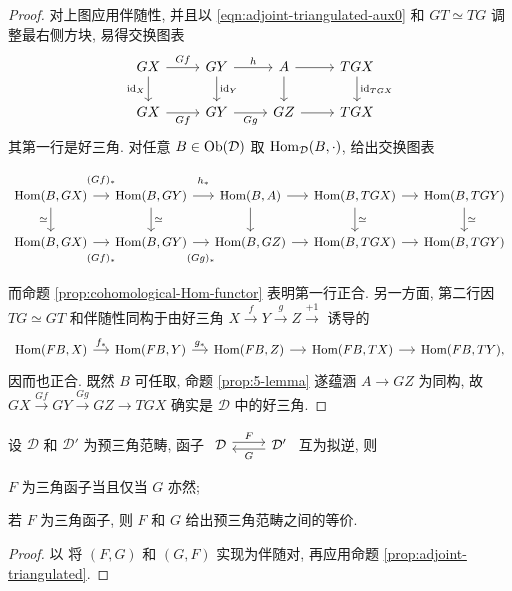 \begin{proof}
	对上图应用伴随性, 并且以 \eqref{eqn:adjoint-triangulated-aux0} 和 $GT \simeq TG$ 调整最右侧方块, 易得交换图表
	\[\begin{tikzcd}
		GX \arrow[r, "Gf"] \arrow[d, "\identity_X"'] & GY \arrow[d, "\identity_Y"] \arrow[r, "h"] & A \arrow[r] \arrow[d] & TGX \arrow[d, "\identity_{TGX}"] \\
		GX \arrow[r, "Gf"'] & GY \arrow[r, "Gg"'] & GZ \arrow[r] & TGX
	\end{tikzcd}\]
	其第一行是好三角. 对任意 $B \in \operatorname{Ob}(\mathcal{D})$ 取 $\operatorname{Hom}_{\mathcal{D}}(B, \cdot)$, 给出交换图表
	\[\begin{tikzcd}[column sep=small, every cell/.append style={font=\small}]
		\Hom(B, GX) \arrow[r, "(Gf)_*" inner sep=0.8em] \arrow[d, "\simeq"'] & \Hom(B, GY) \arrow[r, "h_*" inner sep=0.8em] \arrow[d, "\simeq"] & \Hom(B, A) \arrow[d] \arrow[r] & \Hom(B, TGX) \arrow[r] \arrow[d, "\simeq"] & \Hom(B, TGY) \arrow[d, "\simeq"] \\
		\Hom(B, GX) \arrow[r, "(Gf)_*"' inner sep=0.8em] & \Hom(B, GY) \arrow[r, "(Gg)_*"' inner sep=0.8em] & \Hom(B, GZ) \arrow[r] & \Hom(B, TGX) \arrow[r] & \Hom(B, TGY)
	\end{tikzcd}\]
	而命题 \ref{prop:cohomological-Hom-functor} 表明第一行正合. 另一方面, 第二行因 $TG \simeq GT$ 和伴随性同构于由好三角 $X \xrightarrow{f} Y \xrightarrow{g} Z \xrightarrow{+1}$ 诱导的
	\[\begin{tikzcd}[column sep=small, every cell/.append style = {font = \small}]
		\Hom(FB, X) \arrow[r, "f_*"] & \Hom(FB, Y) \arrow[r, "g_*"] & \Hom(FB, Z) \arrow[r] & \Hom(FB, TX) \arrow[r] & \Hom(FB, TY) ,
	\end{tikzcd}\]
	因而也正合. 既然 $B$ 可任取, 命题 \ref{prop:5-lemma} 遂蕴涵 $A \to GZ$ 为同构, 故 $GX \xrightarrow{Gf} GY \xrightarrow{Gg} GZ \to TGX$ 确实是 $\mathcal{D}$ 中的好三角.
\end{proof}

\begin{corollary}\label{prop:triangulated-equivalence}
	设 $\mathcal{D}$ 和 $\mathcal{D}'$ 为预三角范畴, 函子
	$\begin{tikzcd}
		\mathcal{D} \arrow[shift left, r, "F"] & \mathcal{D}' \arrow[shift left, l, "G"]
	\end{tikzcd}$
	互为拟逆, 则
	\begin{compactenum}[(i)]
		\item $F$ 为三角函子当且仅当 $G$ 亦然;
		\item 若 $F$ 为三角函子, 则 $F$ 和 $G$ 给出预三角范畴之间的等价.
	\end{compactenum}
\end{corollary}
\begin{proof}
	以 \cite[定理 2.6.12]{Li1} 将 $(F, G)$ 和 $(G, F)$ 实现为伴随对, 再应用命题 \ref{prop:adjoint-triangulated}.
\end{proof}

